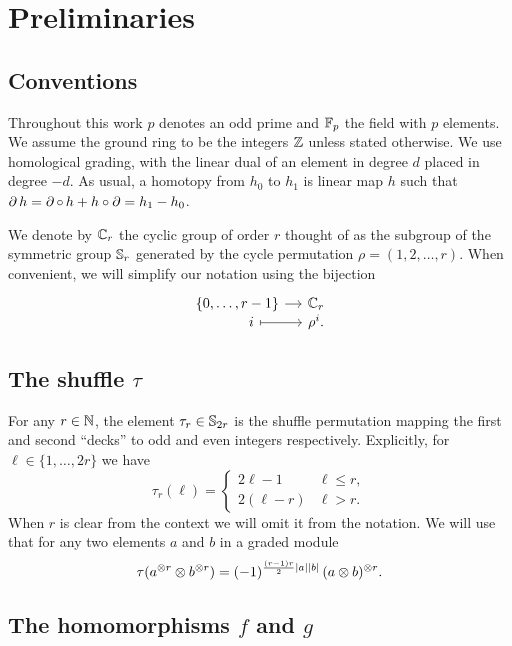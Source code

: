 
\section{Preliminaries}\label{s:preliminaries}

\subsection{Conventions}

Throughout this work $p$ denotes an odd prime and ${\mathbb{F}_p}$ the field with $p$ elements.
We assume the ground ring to be the integers $\mathbb{Z}$ unless stated otherwise.
We use homological grading, with the linear dual of an element in degree $d$ placed in degree $-d$.
As usual, a homotopy from $h_0$ to $h_1$ is linear map $h$ such that $\operatorname{\partial} h = \operatorname{\partial} \mathbin{\circ} \,h + h \mathbin{\circ} \operatorname{\partial} = h_1 - h_0$.

We denote by $\mathbb{C}_r$ the cyclic group of order $r$ thought of as the subgroup of the symmetric group $\mathbb{S}_r$ generated by the cycle permutation $\rho = (1,2,\dots,r)$.
When convenient, we will simplify our notation using the bijection
\[
\begin{tikzcd}[column sep=small,row sep=-5]
	\{0,\dots,r-1\} \rar & \cyc_r \\
	\qquad i \rar[maps to] & \rho^i.
\end{tikzcd}
\]

\subsection{The shuffle $\tau$}\label{ss:shuffle}

For any $r \in \mathbb{N}$, the element $\tau_r \in \mathbb{S}_{2r}$ is the shuffle permutation mapping the first and second ``decks'' to odd and even integers respectively.
Explicitly, for $\ell \in \{1,\dots,2r\}$ we have
\begin{equation*}
	\tau_r(\ell) =
	\begin{cases}
		2\ell-1 & \ell \leq r, \\
		2(\ell-r) & \ell > r.
	\end{cases}
\end{equation*}
When $r$ is clear from the context we will omit it from the notation.
We will use that for any two elements $a$ and $b$ in a graded module
\[
\tau(a^{\otimes r} \otimes b^{\otimes r}) =
(-1)^{\frac{(r-1)r}{2}\lvert a\rvert\lvert b\rvert} \, (a \otimes b)^{\otimes r}.
\]

\subsection{The homomorphisms $f$ and $g$}\label{ss:f and g}

